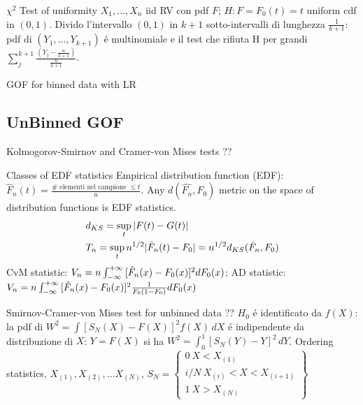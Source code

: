 \begin{frame}{$\chi^2$ Test of uniformity}
$X_1,\ldots,X_n$ iid RV con pdf $F$; $H: F=F_0(t)=t$ uniform cdf in $(0,1)$. Divido l'intervallo $(0,1)$ in $k+1$ sotto-intervalli di lunghezza $\frac{1}{k+1}$: pdf di $(Y_1,\ldots,Y_{k+1})$ \'e multinomiale e il test che rifiuta H per grandi $\sum_j^{k+1}\frac{(Y_j-\frac{n}{k+1})}{\frac{n}{k+1}}$.
\end{frame}

\begin{frame}{GOF for binned data with LR}

\end{frame}

\subsection{UnBinned GOF}\label{unbinnedgof}

\begin{frame}{Kolmogorov-Smirnov and Cramer-von Mises tests ??}
\begin{block}{Classes of EDF statistics}
	Empirical distribution function (EDF): $\hat{F}_n(t)=\frac{\#\text{ elementi nel campione }\leq t}{n}$. Any $d(\hat{F_n},F_0)$ metric on the space of distribution functions is EDF statistics.
	\begin{align*}
	&d_{KS}=\sup_t|F(t)-G(t)|\\
	&T_n=\sup_tn^{1/2}|\hat{F}_n(t)-F_0|=n^{1/2}d_{KS}(\hat{F}_n,F_0)
	\end{align*}
	CvM statistic: $V_n=n\int_{-\infty}^{+\infty}{}[\hat{F}_n(x)-F_0(x)]^2dF_0(x)$; AD statistic: $V_n=n\int_{-\infty}^{+\infty}{}[\hat{F}_n(x)-F_0(x)]^2\frac{1}{F_0(1-F_0)}dF_0(x)$
\end{block}
\end{frame}

\begin{frame}{Smirnov-Cramer-von Mises test for unbinned data ??}
$H_0$ \'e identificato da $f(X)$: la pdf di  $W^2=\int[S_N(X)-F(X)]^2f(X)\,dX$ \'e indipendente da distribuzione di $X$: $Y=F(X)$ si ha $W^2=\int_0^1[S_N(Y)-Y]^2\,dY$. Ordering statistics, $X_{(1)}, X_{(2)}, \ldots X_{(N)}$, $S_N=\left\{\begin{array}{c}0\ X<X_{(1)}\\i/N\ X_{(i)}<X<X_{(i+1)}\\1\ X>X_{(N)}\end{array}\right\}$

\end{frame}

